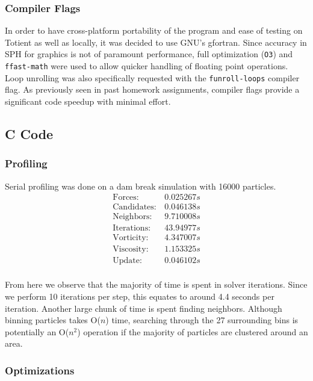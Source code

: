 \documentclass{scrartcl}
\begin{document}
  \subsubsection{Compiler Flags}
  In order to have cross-platform portability of the program and ease of testing on Totient as well as locally, it was decided to use GNU's gfortran. Since accuracy in SPH for graphics is not of paramount performance, full optimization (\texttt{O3}) and \texttt{ffast-math} were used to allow quicker handling of floating point operations. Loop unrolling was also specifically requested with the \texttt{funroll-loops} compiler flag. As previously seen in past homework assignments, compiler flags provide a significant code speedup with minimal effort.
 
  \subsection{C Code}
  \subsubsection{Profiling}
          
          Serial profiling was done on a dam break simulation with 16000 particles.
          \[\begin{array}{lc}
          \mathrm{Forces:}     & 0.025267 s \\
          \mathrm{Candidates:} & 0.046138 s \\
          \mathrm{Neighbors:}  & 9.710008 s \\
          \mathrm{Iterations:} & 43.94977 s \\
          \mathrm{Vorticity:}  & 4.347007 s \\
          \mathrm{Viscosity:}  & 1.153325 s \\
          \mathrm{Update:}     & 0.046102 s \\
          \end{array}\]
          
          From here we observe that the majority of time is spent in solver iterations. Since we perform 10 iterations per step, this equates to around 4.4 seconds per iteration. Another large chunk of time is spent finding neighbors. Although binning particles takes O($n$) time, searching through the 27 surrounding bins is potentially an O($n^2$) operation if the majority of particles are clustered around an area.
          \newpage
              \subsubsection{Optimizations}
\end{document}
